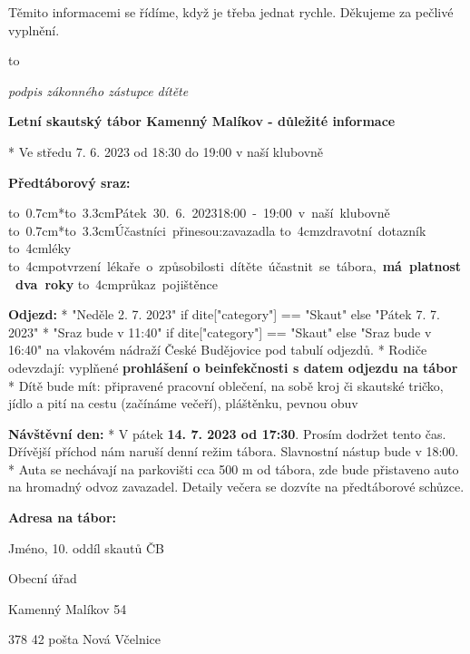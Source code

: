 Těmito informacemi se řídíme, když je třeba jednat rychle. Děkujeme za pečlivé vyplnění.
\smallskip

\hbox to 

{\hfill\it\typosize[7/13]podpis zákonného zástupce dítěte}

\vfil\break

\centerline{\typosize[14/13]\bf Letní skautský tábor Kamenný Malíkov - důležité informace}
\bigskip


\begitems
* Ve středu 7. 6. 2023 od 18:30 do 19:00 v naší klubovně
\enditems

{\bf Předtáborový sraz:}

\begitems
\hbox{\hbox to 0.7cm{}*\hbox to 3.3cm{Pátek 30. 6. 2023\hfil}18:00 - 19:00 v naší klubovně}
\hbox{\hbox to 0.7cm{}*\hbox to 3.3cm{Účastníci přinesou:\hfil}zavazadla}
\hbox{\hbox to 4cm{\hfil}zdravotní dotazník}
\hbox{\hbox to 4cm{\hfil}léky}
\hbox{\hbox to 4cm{\hfil}potvrzení lékaře o způsobilosti dítěte účastnit se tábora, \bf má platnost dva roky}
\hbox{\hbox to 4cm{\hfil}průkaz pojištěnce}
\enditems

{\bf Odjezd:}
\begitems
* {{ "Neděle 2. 7. 2023" if dite["category"] == "Skaut" else "Pátek 7. 7. 2023" }}
* {{"Sraz bude v 11:40" if dite["category"] == "Skaut" else "Sraz bude v 16:40"}} na vlakovém nádraží České Budějovice pod tabulí odjezdů.
* Rodiče odevzdají: vyplňené {\bf prohlášení o beinfekčnosti s datem odjezdu na tábor}
* Dítě bude mít: připravené pracovní oblečení, na sobě kroj či skautské tričko, jídlo a pití na cestu (začínáme večeří), pláštěnku, pevnou obuv
\enditems

{\bf Návštěvní den:}
\begitems
* V pátek {\bf 14. 7. 2023 od 17:30}. Prosím dodržet tento čas. Dřívější příchod nám naruší denní režim tábora. Slavnostní nástup bude v 18:00. 
* Auta se nechávají na parkovišti cca 500 m od tábora, zde bude přistaveno auto na hromadný odvoz zavazadel. Detaily večera se dozvíte na předtáborové schůzce.
\enditems

{\bf Adresa na tábor:}

\parindent=4cm

Jméno, 10. oddíl skautů ČB

Obecní úřad

Kamenný Malíkov 54

378 42 pošta Nová Včelnice

\parindent=0cm

